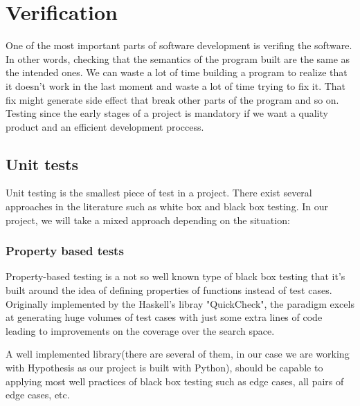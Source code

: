 \section{Verification}
  One of the most important parts of software development is verifing the
  software. In other words, checking that the semantics of the program built
  are the same as the intended ones. We can waste a lot of time building a
  program to realize that it doesn't work in the last moment and waste a lot
  of time trying to fix it. That fix might generate side effect that break other
  parts of the program and so on. Testing since the early stages of a project
  is mandatory if we want a quality product and an efficient development
  proccess.

  \subsection{Unit tests}

    Unit testing is the smallest piece of test in a project. There exist several
    approaches in the literature such as white box and black box testing. In
    our project, we will take a mixed approach depending on the situation:

    \subsubsection{Property based tests}

    Property-based testing is a not so well known type of black box testing that
    it's built around the idea of defining properties of functions instead of
    test cases. Originally implemented by the Haskell's libray
    "QuickCheck"\cite{QuickCheck}, the paradigm excels at generating huge
    volumes of test cases with just some extra lines of code leading
    to improvements on the coverage over the search space.

    A well implemented library(there are several of them, in our case we are
    working with Hypothesis\cite{Hypothesis} as our project is built with
    Python), should be capable to applying most well practices of black box
    testing such as edge cases, all pairs of edge cases, etc.

